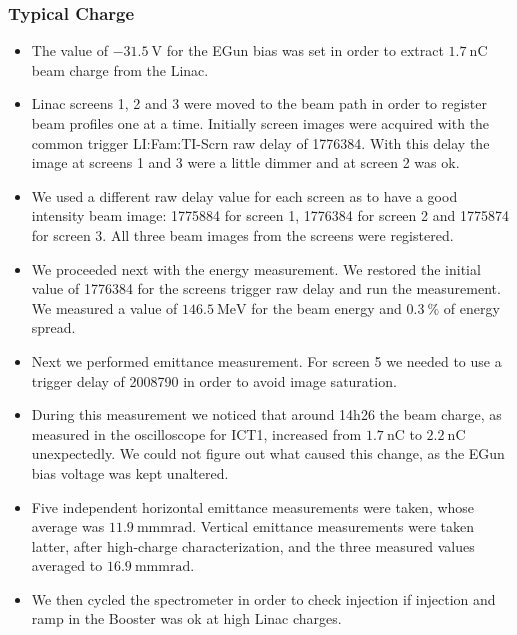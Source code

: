 \documentclass{article}
\begin{document}
\subsubsection{Typical Charge}
\begin{itemize}
\item The value of $\SI{-31.5}{\volt}$ for the EGun bias was set in order to extract $\SI{1.7}{\nano \coulomb}$ beam charge from the Linac.
\item Linac screens 1, 2 and 3 were moved to the beam path in order to register beam profiles one at a time. Initially screen images were acquired with the common trigger LI:Fam:TI-Scrn raw delay of 1776384. With this delay the image at screens 1 and 3 were a little dimmer and at screen 2 was ok.
\item We used a different raw delay value for each screen as to have a good intensity beam image: 1775884 for screen 1, 1776384 for screen 2 and 1775874 for screen 3. All three beam images from the screens were registered.
\item We proceeded next with the energy measurement. We restored the initial value of 1776384 for the screens trigger raw delay and run the measurement. We measured a value of $\SI{146.5}{\mega \electronvolt}$ for the beam energy and $\SI{0.3}{\percent}$ of energy spread.
\item Next we performed emittance measurement. For screen 5 we needed to use a trigger delay of 2008790 in order to avoid image saturation.
\item During this measurement we noticed that around 14h26 the beam charge, as measured in the oscilloscope for ICT1, increased from $\SI{1.7}{\nano \coulomb}$ 
to $\SI{2.2}{\nano \coulomb}$ unexpectedly. We could not figure out what caused this change, as the EGun bias voltage was kept unaltered. 
\item Five independent horizontal emittance measurements were taken, whose average was $\SI{11.9}{\milli \meter\milli \radian}$. Vertical emittance measurements were taken latter, after high-charge characterization, and the three measured values averaged to $\SI{16.9}{\milli \meter\milli\radian}$.
\item We then cycled the spectrometer in order to check injection if injection and ramp in the Booster was ok at high Linac charges.
\end{itemize}
\end{document}

